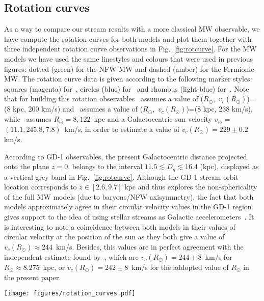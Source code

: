 \documentclass[twocolumn]{aa}
\begin{document}
\subsection{Rotation curves}
As a way to compare our stream results with a more classical MW observable, we have compute the rotation curves for both models and plot them together with three independent rotation curve observations in
Fig.~\ref{fig:rotcurve}.
For the MW models we have used the same linestyles and colours that were used in previous figures:
dotted (green) for the NFW-MW and dashed (amber) for the Fermionic-MW.
The rotation curve data is given according to the following marker styles: squares (magenta)
for~\citet{sofue_rotation_2013}, circles (blue) for~\citet{Eilers_2019} and rhombus (light-blue)
for~\citet{sofue_2020}. Note that for building this rotation observables~\citet{sofue_rotation_2013}
assumes a value of ($R_\odot$,~$v_c(R_\odot)$)=(8 kpc, 200 km/s) and~\citet{sofue_2020} assumes
a value of ($R_\odot$,~$v_c(R_\odot)$)=(8 kpc, 238 km/s), while~\citet{Eilers_2019}
assumes $R_\odot=8,122$~kpc and a Galactocentric sun velocity $v_\odot$ = $(11.1, 245.8, 7.8)$~km/s,
in order to estimate a value of $v_c(R_\odot)=229\pm0.2$ km/s.

According to GD-1 observables, the present Galactocentric distance projected onto the plane $z=0$,
belongs to the interval $11.5 \lesssim D_g \lesssim 16.4$ (kpc), displayed as a vertical grey band in
Fig.~\ref{fig:rotcurve}.
Although the GD-1 stream orbit location corresponds to $z\in [2.6, 9.7]$ kpc and thus explores the non-sphericality of the full MW models (due to baryons/NFW axisymmetry), the fact that both models approximately agree in their circular velocity values in the GD-1 region gives support to the idea of using stellar streams as Galactic
accelerometers~\citep{Ibata_2016}.
It is interesting to note a coincidence between both models in their values of circular velocity
at the position of the sun as they both give a value of $v_c(R_\odot)\approx 244$~km/s.
Besides, this values are in perfect agreement with the independent estimate found
by~\citet{2020arXiv201202169B}, which are $v_c(R_\odot)=244\pm 8$~km/s for $R_\odot \approx 8.275$~kpc, or $v_c(R_\odot)=242\pm 8$~km/s for the addopted value of $R_\odot$ in the present paper.

\begin{figure*}
   \centering
   \texttt{[image: figures/rotation\_curves.pdf]}
   \caption{Rotation curve of MW models and observations: NFW-MW model in dotted (green), Fermionic-MW in dashed (amber),~\citet{sofue_rotation_2013} with squares (magenta),~\citet{Eilers_2019} with circles (blue) for~\citet{Eilers_2019} and~\citet{sofue_2020} with rhombus (light-blue). The region where the GD-1 stream is located at cero redshift is displayed with a vertical grey band.}
   \label{fig:rotcurve}
\end{figure*}
\end{document}
